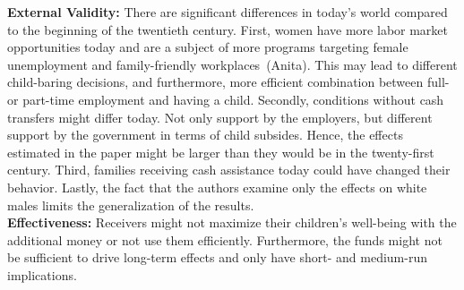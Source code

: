 \textbf{External Validity:} There are significant differences in today's world compared to the beginning of the twentieth century. First, women have more labor market opportunities today and are a subject of more programs targeting female unemployment and family-friendly workplaces~(Anita). This may lead to different child-baring decisions, and furthermore, more efficient combination between full- or part-time employment and having a child. Secondly, conditions without cash transfers might differ today. Not only support by the employers, but different support by the government in terms of child subsides. Hence, the effects estimated in the paper might be larger than they would be in the twenty-first century. Third, families receiving cash assistance today could have changed their behavior. Lastly, the fact that the authors examine only the effects on white males limits the generalization of the results.\\   
\textbf{Effectiveness:} Receivers might not maximize their children's well-being with the additional money or not use them efficiently. Furthermore, the funds might not be sufficient to drive long-term effects and only have short- and medium-run implications. 